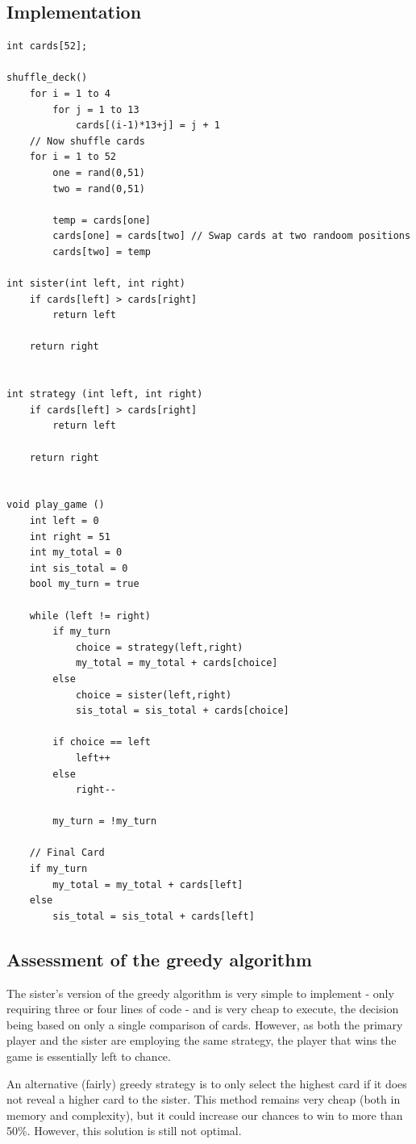 \documentclass[11pt]{article}
\begin{document}
\subsection{Implementation}
\begin{lstlisting}
int cards[52];

shuffle_deck()
	for i = 1 to 4
		for j = 1 to 13
			cards[(i-1)*13+j] = j + 1
	// Now shuffle cards
	for i = 1 to 52
		one = rand(0,51)
		two = rand(0,51)

		temp = cards[one]
		cards[one] = cards[two] // Swap cards at two randoom positions
		cards[two] = temp

int sister(int left, int right)
	if cards[left] > cards[right]
		return left
	
	return right


int strategy (int left, int right)
	if cards[left] > cards[right]
		return left

	return right


void play_game ()
	int left = 0
	int right = 51
	int my_total = 0
	int sis_total = 0
	bool my_turn = true

	while (left != right)
		if my_turn
			choice = strategy(left,right)
			my_total = my_total + cards[choice]
		else
			choice = sister(left,right)
			sis_total = sis_total + cards[choice]

		if choice == left
			left++
		else
			right--

		my_turn = !my_turn

	// Final Card
	if my_turn
		my_total = my_total + cards[left]
	else
		sis_total = sis_total + cards[left]
\end{lstlisting}

\subsection{Assessment of the greedy algorithm}

The sister's version of the greedy algorithm is very simple to implement - only requiring three or four lines of code - and is very cheap to execute, the decision being based on only a single comparison of cards. However, as both the primary player and the sister are employing the same strategy, the player that wins the game is essentially left to chance.

An alternative (fairly) greedy strategy is to only select the highest card if it does not reveal a higher card to the sister. This method
remains very cheap (both in memory and complexity), but it could increase our chances to win to more than 50\%.
However, this solution is still not optimal.
\end{document}
